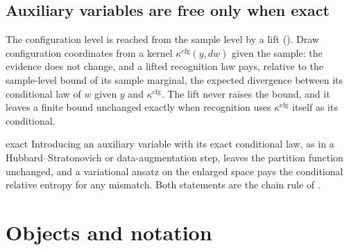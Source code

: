\subsection{Auxiliary variables are free only when exact}

The configuration level is reached from the sample level by a lift
(). Draw configuration coordinates from a kernel
$\kappa^{\mathrm{cfg}}(y,dw)$ given the sample: the evidence does not change, and a lifted recognition law pays,
relative to the sample-level bound of its sample marginal, the expected divergence between its conditional law
of $w$ given $y$ and $\kappa^{\mathrm{cfg}}$. The lift never raises the bound, and it leaves a finite bound
unchanged exactly when recognition uses $\kappa^{\mathrm{cfg}}$ itself as its conditional.

\begin{analogy}{exact}
Introducing an auxiliary variable with its exact conditional law, as in a Hubbard--Stratonovich or
data-augmentation step, leaves the partition function unchanged, and a variational ansatz on the enlarged
space pays the conditional relative entropy for any mismatch. Both statements are the chain rule of
.
\end{analogy}

\section{Objects and notation}
\label{comp:ch03-objects}

